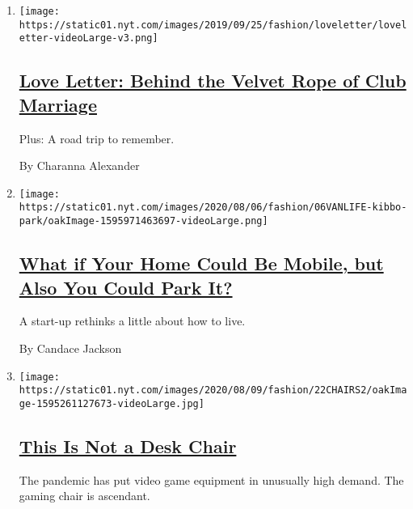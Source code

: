 \begin{enumerate}
\def\labelenumi{\arabic{enumi}.}
\item
  \texttt{[image: https://static01.nyt.com/images/2019/09/25/fashion/loveletter/loveletter-videoLarge-v3.png]}

  \hypertarget{love-letter-behind-the-velvet-rope-of-club-marriage}{%
  \subsection{\texorpdfstring{\href{/2020/08/07/style/love-letter-newsletter-behind-the-velvet-rope-of-club-marriage.html}{Love
  Letter: Behind the Velvet Rope of Club
  Marriage}}{Love Letter: Behind the Velvet Rope of Club Marriage}}\label{love-letter-behind-the-velvet-rope-of-club-marriage}}

  Plus: A road trip to remember.

  By Charanna Alexander
\item
  \texttt{[image: https://static01.nyt.com/images/2020/08/06/fashion/06VANLIFE-kibbo-park/oakImage-1595971463697-videoLarge.png]}

  \hypertarget{what-if-your-home-could-be-mobile-but-also-you-could-park-it}{%
  \subsection{\texorpdfstring{\href{/2020/08/07/style/kibbo-van-life-startup.html}{What
  if Your Home Could Be Mobile, but Also You Could Park
  It?}}{What if Your Home Could Be Mobile, but Also You Could Park It?}}\label{what-if-your-home-could-be-mobile-but-also-you-could-park-it}}

  A start-up rethinks a little about how to live.

  By Candace Jackson
\item
  \texttt{[image: https://static01.nyt.com/images/2020/08/09/fashion/22CHAIRS2/oakImage-1595261127673-videoLarge.jpg]}

  \hypertarget{this-is-not-a-desk-chair}{%
  \subsection{\texorpdfstring{\href{/2020/08/07/style/gamer-chair-market-herman-miller.html}{This
  Is Not a Desk
  Chair}}{This Is Not a Desk Chair}}\label{this-is-not-a-desk-chair}}

  The pandemic has put video game equipment in unusually high demand.
  The gaming chair is ascendant.


\end{enumerate}
